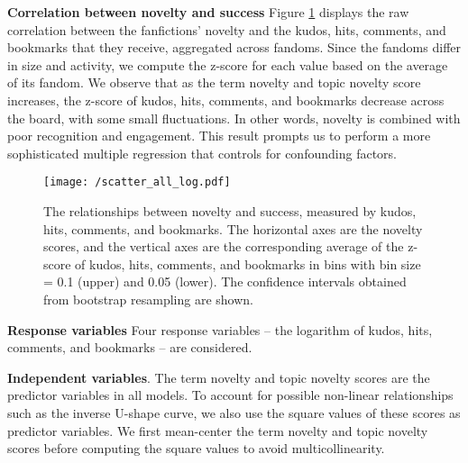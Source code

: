 \documentclass[letterpaper]{article} %
\begin{document}
\textbf{Correlation between novelty and success}    Figure \ref{fig:tfidf_lda_kudos} displays the raw correlation between the fanfictions' novelty and the kudos, hits, comments, and bookmarks that they receive, aggregated across fandoms. Since the fandoms differ in size and activity, we compute the z-score for each value based on the average of its fandom. We observe that as the term novelty and topic novelty score increases, the z-score of kudos, hits, comments, and bookmarks decrease across the board, with some small fluctuations. In other words, novelty is combined with poor recognition and engagement. This result prompts us to perform a more sophisticated multiple regression that controls for confounding factors.

 \begin{figure}
    \centering
          \texttt{[image: /scatter\_all\_log.pdf]}
        \caption{The relationships between novelty and success, measured by kudos, hits, comments, and bookmarks. The horizontal axes are the novelty scores, and the vertical axes are the corresponding average of the z-score of kudos, hits, comments, and bookmarks in bins with bin size = 0.1 (upper) and 0.05 (lower). The confidence intervals obtained from bootstrap resampling are shown. }
        \label{fig:tfidf_lda_kudos}
\end{figure}

\textbf{Response variables}  Four response variables -- the logarithm of kudos, hits, comments, and bookmarks -- are considered. 

\textbf{Independent variables}. The term novelty and topic novelty scores are the predictor variables in all models. To account for possible non-linear relationships such as the inverse U-shape curve, we also use the square values of these scores as predictor variables. We first mean-center the term novelty and topic novelty scores before computing the square values to avoid multicollinearity.
\end{document}
